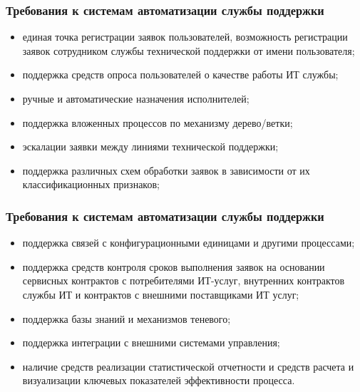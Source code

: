 \documentclass{../industrial-development}
\begin{document}
\begin{frame} \frametitle{Требования к системам автоматизации службы поддержки}
	\begin{itemize} 
		\item единая точка регистрации заявок пользователей, возможность регистрации заявок сотрудником службы технической поддержки от имени пользователя;
		\item поддержка средств опроса пользователей о качестве работы ИТ службы;
		\item ручные и автоматические назначения исполнителей;
		\item поддержка вложенных процессов по механизму дерево/ветки;
		\item эскалации заявки между линиями технической поддержки;
		\item поддержка различных схем обработки заявок в зависимости от их классификационных признаков;
	\end{itemize}
\end{frame}
\lecturenotes

\begin{frame} \frametitle{Требования к системам автоматизации службы поддержки}
	\begin{itemize} 
		\item поддержка связей с конфигурационными единицами и другими процессами;
		\item поддержка средств контроля сроков выполнения заявок на основании сервисных контрактов с потребителями ИТ-услуг, внутренних контрактов службы ИТ и контрактов с внешними поставщиками ИТ услуг;
		\item  поддержка базы знаний и механизмов теневого;
		\item поддержка интеграции с внешними системами управления;
		\item наличие средств реализации статистической отчетности и средств расчета и визуализации ключевых показателей эффективности процесса.
	\end{itemize}
\end{frame}
\lecturenotes
\end{document}

